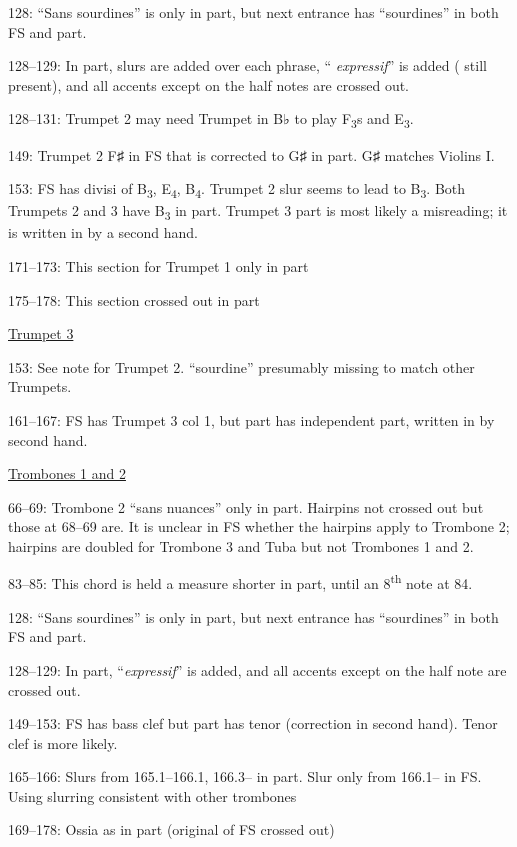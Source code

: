 \documentclass[twoside]{article}
\newcommand\dynmark[1]{\scalebox{0.9}{#1}{\kern1pt}}
\begin{document}
\begin{hangparas}{15pt}{1}
\begin{multicols}{2}
128: ``Sans sourdines'' is only in part, but next entrance has ``sourdines'' in both FS and part.

128--129: In part, slurs are added over each phrase, ``\dynmark{\mf} \textit{expressif}'' is added (\dynmark{\f} still present), and all accents except on the half notes are crossed out.

128--131: Trumpet 2 may need Trumpet in B♭ to play F\textsubscript{3}s and E\textsubscript{3}.

149: Trumpet 2 F♯ in FS that is corrected to G♯ in part. G♯ matches Violins I.

153: FS has divisi of B\textsubscript{3}, E\textsubscript{4}, B\textsubscript{4}. Trumpet 2 slur seems to lead to B\textsubscript{3}. Both Trumpets 2 and 3 have B\textsubscript{3} in part. Trumpet 3 part is most likely a misreading; it is written in by a second hand.

171--173: This section for Trumpet 1 only in part

175--178: This section crossed out in part

\underline{Trumpet 3}

153: See note for Trumpet 2. ``sourdine'' presumably missing to match other Trumpets.

161--167: FS has Trumpet 3 col 1, but part has independent part, written in by second hand.

\underline{Trombones 1 and 2}

66--69: Trombone 2 ``sans nuances'' only in part. Hairpins not crossed out but those at 68--69 are. It is unclear in FS whether the hairpins apply to Trombone 2; hairpins are doubled for Trombone 3 and Tuba but not Trombones 1 and 2.

83--85: This chord is held a measure shorter in part, until an 8\textsuperscript{th} note at 84.

128: ``Sans sourdines'' is only in part, but next entrance has ``sourdines'' in both FS and part.

128--129: In part, ``\textit{expressif}'' is added, and all accents except on the half note are crossed out.

149--153: FS has bass clef but part has tenor (correction in second hand). Tenor clef is more likely.

165--166: Slurs from 165.1--166.1, 166.3-- in part. Slur only from 166.1-- in FS. Using slurring consistent with other trombones

169--178: Ossia as in part (original of FS crossed out)


\end{multicols}
\end{hangparas}
\end{document}
